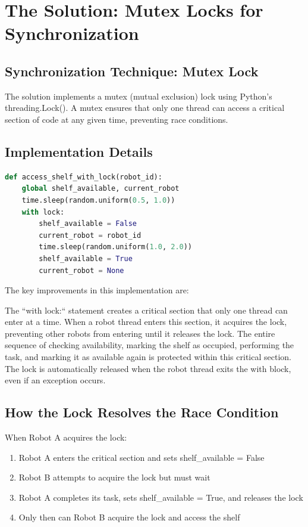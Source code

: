 \documentclass{article}
\begin{document}
\section{The Solution: Mutex Locks for Synchronization}
\subsection{Synchronization Technique: Mutex Lock}
The solution implements a mutex (mutual exclusion) lock using Python's threading.Lock(). A mutex ensures that only one thread can access a critical section of code at any given time, preventing race conditions.
\subsection{Implementation Details}

\begin{file}[Main.py]
	\begin{lstlisting}[language=Python]
def access_shelf_with_lock(robot_id):
    global shelf_available, current_robot
    time.sleep(random.uniform(0.5, 1.0))
    with lock:
        shelf_available = False
        current_robot = robot_id
        time.sleep(random.uniform(1.0, 2.0))
        shelf_available = True
        current_robot = None
\end{lstlisting}
\end{file}

The key improvements in this implementation are:

The ``with lock:`` statement creates a critical section that only one thread can enter at a time.
When a robot thread enters this section, it acquires the lock, preventing other robots from entering until it releases the lock.
The entire sequence of checking availability, marking the shelf as occupied, performing the task, and marking it as available again is protected within this critical section.
The lock is automatically released when the robot thread exits the with block, even if an exception occurs.

\subsection{How the Lock Resolves the Race Condition}
When Robot A acquires the lock:

\begin{enumerate}
	\item Robot A enters the critical section and sets shelf\_available = False
	\item Robot B attempts to acquire the lock but must wait
	\item Robot A completes its task, sets shelf\_available = True, and releases the lock
	\item Only then can Robot B acquire the lock and access the shelf
\end{enumerate}
\end{document}
